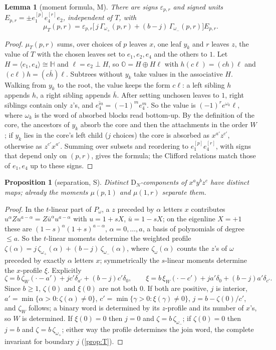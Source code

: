 \documentclass[11pt,a4paper]{article}
\newtheorem{lemma}[thm]{Lemma}
\newtheorem{proposition}[thm]{Proposition}
\theoremstyle{definition}
\theoremstyle{remark}
\newcommand{\OO}{\mathbb{O}}
\newcommand{\DN}{\mathrm{D}_N}
\begin{document}
\begin{lemma}[moment formula, M]\label{lem:M}
There are signs $\varepsilon_{p,r}$ and signed units $E_{p,r}=\pm e_1^{[p]}e_4^{[r]}e_2$, independent
of $T$, with
\[
  \mu_T(p,r)=\varepsilon_{p,r}\bigl[\,j\,\Gamma_{\omega_+}(p,r)+(b-j)\,\Gamma_{\omega_-}(p,r)\bigr]E_{p,r}.
\]
\end{lemma}
\begin{proof}
$\mu_T(p,r)$ sums, over choices of $p$ leaves $x$, one leaf $y_k$ and $r$ leaves $z$, the value of $T$
with the chosen leaves set to $e_1,e_2,e_4$ and the others to $1$. Let
$H=\langle e_1,e_4\rangle\cong\mathbb H$ and $\ell=e_2\perp H$, so $\OO=H\oplus H\ell$ with
$h(c\ell)=(ch)\ell$ and $(c\ell)h=(c\bar h)\ell$. Subtrees without $y_k$ take values in the associative
$H$. Walking from $y_k$ to the root, the value keeps the form $c\ell$: a left sibling $h$ appends $h$, a
right sibling appends $\bar h$. After setting unchosen leaves to $1$, right siblings contain only $z$'s,
and $\overline{e_4^m}=(-1)^me_4^m$. So the value is $(-1)^re^{\omega_k}\ell$, where $\omega_k$ is the
word of absorbed blocks read bottom-up. By the definition of the core, the ancestors of $y_k$ absorb the
core and then the attachments in the order $W$; if $y_k$ lies in the core's left child ($j$ choices) the
core is absorbed as $x^{a'}z^{c'}$, otherwise as $z^{c'}x^{a'}$. Summing over subsets and reordering to
$e_1^{[p]}e_4^{[r]}$, with signs that depend only on $(p,r)$, gives the formula; the Clifford relations
match those of $e_1,e_4$ up to these signs.
\end{proof}

\begin{proposition}[separation, S]\label{prop:S}
Distinct $\DN$-components of $x^ay^bz^c$ have distinct maps; already the moments $\mu(p,1)$ and
$\mu(1,r)$ separate them.
\end{proposition}
\begin{proof}
In the $t$-linear part of $P_\omega$, a $z$ preceded by $\alpha$ letters $x$ contributes
$u^\alpha Zu^{a-\alpha}=Z\bar u^\alpha u^{a-\alpha}$ with $u=1+sX$, $\bar u=1-sX$; on the eigenline
$X=+1$ these are $(1-s)^\alpha(1+s)^{a-\alpha}$, $\alpha=0,\dots,a$, a basis of polynomials of degree
$\le a$. So the $t$-linear moments determine the weighted profile
$\zeta(\alpha)=j\,\zeta_{\omega_+}(\alpha)+(b-j)\,\zeta_{\omega_-}(\alpha)$, where $\zeta_\omega(\alpha)$
counts the $z$'s of $\omega$ preceded by exactly $\alpha$ letters $x$; symmetrically the $s$-linear
moments determine the $x$-profile $\xi$. Explicitly
\[
  \zeta=b\,\zeta_W(\cdot-a')+jc'\delta_{a'}+(b-j)c'\delta_0,\qquad
  \xi=b\,\xi_W(\cdot-c')+ja'\delta_0+(b-j)a'\delta_{c'}.
\]
Since $b\ge1$, $\zeta(0)$ and $\xi(0)$ are not both $0$. If both are positive, $j$ is interior,
$a'=\min\{\alpha>0:\zeta(\alpha)\ne0\}$, $c'=\min\{\gamma>0:\xi(\gamma)\ne0\}$, $j=b-\zeta(0)/c'$, and
$\zeta_W$ follows; a binary word is determined by its $z$-profile and its number of $x$'s, so $W$ is
determined. If $\xi(0)=0$ then $j=0$ and $\zeta=b\,\zeta_{\omega_-}$; if $\zeta(0)=0$ then $j=b$ and
$\zeta=b\,\zeta_{\omega_+}$; either way the profile determines the join word, the complete invariant for
boundary $j$ (\cref{prop:T}).
\end{proof}
\end{document}

